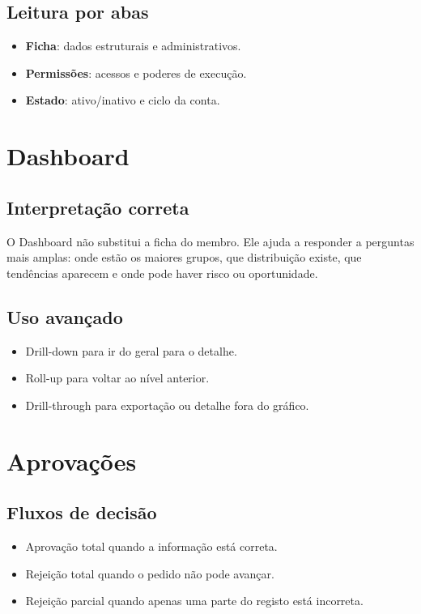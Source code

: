 \subsection{Leitura por abas}
\begin{itemize}
  \item \textbf{Ficha}: dados estruturais e administrativos.
  \item \textbf{Permissões}: acessos e poderes de execução.
  \item \textbf{Estado}: ativo/inativo e ciclo da conta.
\end{itemize}

\section{Dashboard}
\subsection{Interpretação correta}
O Dashboard não substitui a ficha do membro. Ele ajuda a responder a perguntas mais amplas: onde estão os maiores grupos, que distribuição existe, que tendências aparecem e onde pode haver risco ou oportunidade.

\subsection{Uso avançado}
\begin{itemize}
  \item Drill-down para ir do geral para o detalhe.
  \item Roll-up para voltar ao nível anterior.
  \item Drill-through para exportação ou detalhe fora do gráfico.
\end{itemize}

\section{Aprovações}
\subsection{Fluxos de decisão}
\begin{itemize}
  \item Aprovação total quando a informação está correta.
  \item Rejeição total quando o pedido não pode avançar.
  \item Rejeição parcial quando apenas uma parte do registo está incorreta.
\end{itemize}

